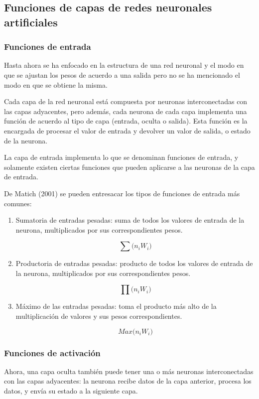 \documentclass[a4paper,12pt,oneside,spanish]{book}
\begin{document}
\subsection{Funciones de capas de redes neuronales artificiales}

\subsubsection{Funciones de entrada}
Hasta ahora se ha enfocado en la estructura de una red neuronal y el modo en que se ajustan los pesos de acuerdo a una salida pero no se ha mencionado el modo en que se obtiene la misma.\par

Cada capa de la red neuronal está compuesta por neuronas interconectadas con las capas adyacentes, pero además, cada neurona de cada capa implementa una función de acuerdo al tipo de capa (entrada, oculta o salida). Esta función es la encargada de procesar el valor de entrada y devolver un valor de salida, o estado de la neurona.\par

La capa de entrada implementa lo que se denominan funciones de entrada, y solamente existen ciertas funciones que pueden aplicarse a las neuronas de la capa de entrada.\par 

De Matich (2001) se pueden entresacar los tipos de funciones de entrada más comunes:
\begin{enumerate}
	\item Sumatoria de entradas pesadas: suma de todos los valores de
	entrada de la neurona, multiplicados por sus correspondientes pesos.\par 
	\[\sum \textit{($n_i$$W_i$)} \]
	
	\item Productoria de entradas pesadas: producto de todos los valores de entrada de la neurona, multiplicados por sus correspondientes pesos.\par 
	\[\prod \textit{($n_i$$W_i$)} \]

	\item Máximo de las entradas pesadas: toma el producto más alto de la multiplicación de valores y sus pesos correspondientes.\par 
	
	\[ \textit{Max($n_i$$W_i$)} \]
\end{enumerate}


\subsubsection{Funciones de activación}
Ahora, una capa oculta también puede tener una o más neuronas interconectadas con las capas adyacentes: la neurona recibe datos de la capa anterior, procesa los datos, y envía su estado a la siguiente capa.\par
\end{document}
